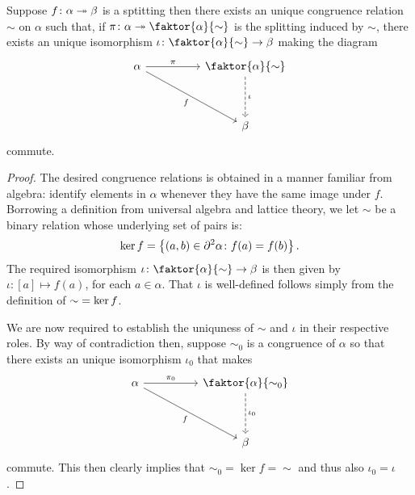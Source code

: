 \begin{prp}
         Suppose $f\colon\alpha\twoheadrightarrow\beta$ is a sptitting then there exists an unique congruence relation $\sim$ on $\alpha$ such that, if $\pi\colon\alpha\tto\faktor{\alpha}{\sim}$ is the splitting induced by $\sim$, there exists an unique isomorphism $\iota\colon\faktor{\alpha}{\sim}\to\beta$ making the diagram
        \begin{equation}
            \begin{tikzcd}
		\alpha \arrow[rr, "\pi",rightarrow]&&   \faktor{\alpha}{\sim}\\
		\\
		 &&   \beta \arrow[from=uu,"\iota", dashrightarrow] \arrow[from=uull,"f"']
            \end{tikzcd}
        \end{equation}
        commute.
\end{prp}
\begin{proof}
	The desired congruence relations is obtained in a manner familiar from algebra:  identify elements in $\alpha$ whenever they have the same image under $f$.  Borrowing a definition from universal algebra and lattice theory, we let $\sim$ be a binary relation whose underlying set of pairs is:
	\begin{equation}
		\operatorname{ker} f=\left\lbrace (a,b)\in\partial^{2}\alpha\colon f(a)=f(b) \right\rbrace.
	\end{equation}
	The required isomorphism $\iota\colon\faktor{\alpha}{\sim}\to\beta$ is then given by $\iota\colon[a]\mapsto f(a)$, for each $a\in\alpha$.  That $\iota$ is well-defined follows simply from the definition of ${\sim}=\operatorname{ker} f$.

	We are now required to establish the uniquness of $\sim$ and $\iota$ in their respective roles.  By way of contradiction then, suppose $\sim_0$ is a congruence of $\alpha$ so that there exists an unique isomorphism $\iota_0$ that makes
        \begin{equation}
            \begin{tikzcd}
		\alpha \arrow[rr, "\pi_0",rightarrow]&&   \faktor{\alpha}{\sim_0}\\
		\\
		 &&   \beta \arrow[from=uu,"\iota_0", dashrightarrow] \arrow[from=uull,"f"']
            \end{tikzcd}
        \end{equation}
	commute.  This then clearly implies that ${\sim_0}=\ker f={\sim}$ and thus also $\iota_0=\iota$.
\end{proof}

